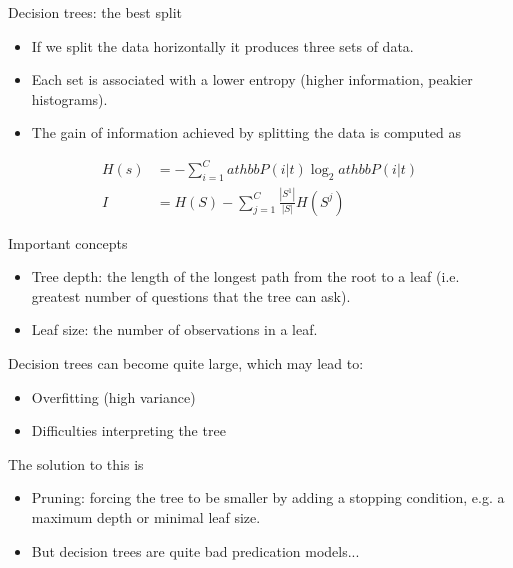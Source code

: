 \documentclass[11pt,aspectratio=1610,usenames,dvipsnames]{beamer} %
\begin{document}
\begin{frame}{Decision trees: the best split}
	\begin{itemize}
		\item If we split the data horizontally it produces three sets of data.
		\item Each set is associated with a lower entropy (higher information, peakier histograms).
		\item The gain of information achieved by splitting the data is computed as
	\end{itemize}
	\begin{align*}
		H(s)&=-\sum_{i=1}^{C}athbb{P}(i|t)\log_{2}athbb{P}(i|t)\\
		I&=H(S)-\sum_{j=1}^{C} \frac{|S^{1}|}{|S|}H(S^{j})
	\end{align*}
\end{frame}

\begin{frame}{Important concepts}
	\begin{itemize}
		\item {\color{uured}Tree depth:} the length of the longest path from the root to a leaf (i.e. greatest number of questions that the tree can ask).
		\item {\color{uured}Leaf size:} the number of observations in a leaf.
	\end{itemize}
	Decision trees can become quite large, which may lead to:
	\begin{itemize}
		\item Overfitting (high variance)
		\item Difficulties interpreting the tree
	\end{itemize}
	The solution to this is
	\begin{itemize}
		\item {\color{uured}Pruning:} forcing the tree to be smaller by adding a {\color{uured}stopping condition}, e.g. a maximum depth or minimal leaf size.
		\item But decision trees are quite bad predication models...
	\end{itemize}
\end{frame}
\end{document}
